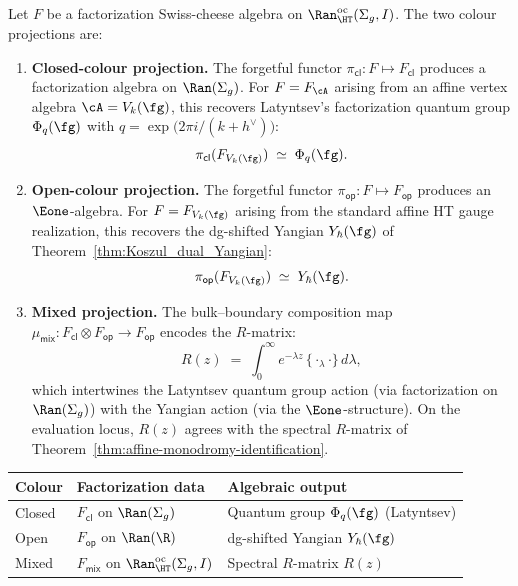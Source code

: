 \begin{theorem}
\label{thm:latyntsev-colour-projections}
Let $F$ be a factorization Swiss-cheese algebra on
$\Ran^{\mathrm{oc}}_{\HT}(\Sigma_g,I)$. The two colour projections are:
\begin{enumerate}[label=\textup{(\roman*)}]
\item \textbf{Closed-colour projection.} The forgetful functor
 $\pi_{\mathsf{cl}}\colon F \mapsto F_{\mathsf{cl}}$ produces a
 factorization algebra on $\Ran(\Sigma_g)$. For
 $F = F_{\cA}$ arising from an affine vertex algebra
 $\cA = V_k(\fg)$, this recovers Latyntsev's factorization
 quantum group $\Phi_q(\fg)$ with
 $q = \exp\!\bigl(2\pi i / (k + h^\vee)\bigr)$:
 \[
 \pi_{\mathsf{cl}}(F_{V_k(\fg)})
 \;\simeq\;
 \Phi_q(\fg).
 \]

\item \textbf{Open-colour projection.} The forgetful functor
 $\pi_{\mathsf{op}}\colon F \mapsto F_{\mathsf{op}}$ produces an
 $\Eone$-algebra. For $F = F_{V_k(\fg)}$ arising from the
 standard affine HT gauge realization, this recovers the
 dg-shifted Yangian $Y_\hbar(\fg)$ of
 Theorem~\textup{\ref{thm:Koszul_dual_Yangian}}:
 \[
 \pi_{\mathsf{op}}(F_{V_k(\fg)})
 \;\simeq\;
 Y_\hbar(\fg).
 \]

\item \textbf{Mixed projection.} The bulk--boundary composition map
 $\mu_{\mathsf{mix}}\colon F_{\mathsf{cl}} \otimes F_{\mathsf{op}}
 \to F_{\mathsf{op}}$ encodes the $R$-matrix:
 \[
 R(z)
 \;=\;
 \int_0^\infty e^{-\lambda z}\,
 \{{\cdot}_\lambda{\cdot}\}\, d\lambda,
 \]
 which intertwines the Latyntsev quantum group action
 \textup{(}via factorization on $\Ran(\Sigma_g)$\textup{)} with
 the Yangian action \textup{(}via the $\Eone$-structure\textup{)}.
 On the evaluation locus, $R(z)$ agrees with the spectral
 $R$-matrix of
 Theorem~\textup{\ref{thm:affine-monodromy-identification}}.
\end{enumerate}
\end{theorem}

\begin{center}
\begin{tabular}{lll}
\textbf{Colour} & \textbf{Factorization data} & \textbf{Algebraic output} \\
\hline
Closed & $F_{\mathsf{cl}}$ on $\Ran(\Sigma_g)$ &
 Quantum group $\Phi_q(\fg)$ (Latyntsev) \\
Open & $F_{\mathsf{op}}$ on $\Ran(\R)$ &
 dg-shifted Yangian $Y_\hbar(\fg)$ \\
Mixed & $F_{\mathsf{mix}}$ on
 $\Ran^{\mathrm{oc}}_{\HT}(\Sigma_g,I)$ &
 Spectral $R$-matrix $R(z)$
\end{tabular}
\end{center}

